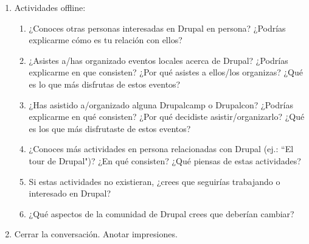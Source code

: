 \begin{enumerate}
\begin{enumerate}
		\end{enumerate}
	\item Actividades offline:
		\begin{enumerate}
			\item ¿Conoces otras personas interesadas en Drupal en persona? ¿Podrías explicarme cómo es tu relación con ellos?
			\item ¿Asistes a\slash has organizado eventos locales acerca de Drupal? ¿Podrías explicarme en que consisten? ¿Por qué asistes a ellos\slash los organizas? ¿Qué es lo que más disfrutas de estos eventos?
			\item ¿Has asistido a\slash organizado alguna Drupalcamp o Drupalcon? ¿Podrías explicarme en qué consisten? ¿Por qué decidiste asistir\slash organizarlo? ¿Qué es los que más disfrutaste de estos eventos?
			\item ¿Conoces más actividades en persona relacionadas con Drupal (ej.: ``El tour de Drupal")? ¿En qué consisten? ¿Qué piensas de estas actividades?
			\item Si estas actividades no existieran, ¿crees que seguirías trabajando o interesado en Drupal?
			\item ¿Qué aspectos de la comunidad de Drupal crees que deberían cambiar?
		\end{enumerate}
	\item Cerrar la conversación. Anotar impresiones.
\end{enumerate}
